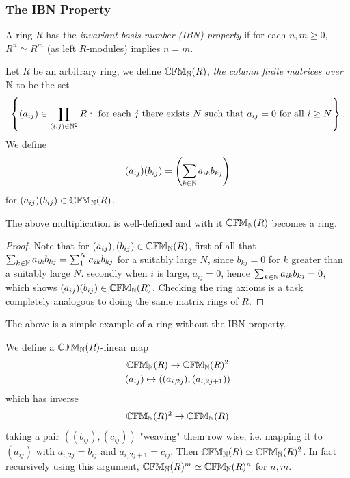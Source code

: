 \subsubsection{The IBN Property}
\begin{definition}
    A ring $R$ has the \emph{invariant basis number (IBN) property} if for each $n,m\geq 0$, $R^n\simeq R^m$ (as left $R$-modules) implies $n=m$.
\end{definition}
\begin{definition}
    Let $R$ be an arbitrary ring, we define $\mathbb{CFM}_{\mathbb{N}}(R)$, \emph{the column finite matrices over $\mathbb{N}$} to be the set 
    $$
        \left\{(a_{ij})\in \prod_{(i,j)\in \mathbb{N}^2} R : \text{ for each } j \text{ there exists } N \text{ such that } a_{ij}=0 \text{ for all } i\geq N\right\}.
    $$
    We define 
    $$
        (a_{ij})(b_{ij})= \left(\sum_{k\in \mathbb{N}}a_{ik}b_{kj}\right)
    $$
    for $(a_{ij})(b_{ij})\in \mathbb{CFM}_{\mathbb{N}}(R)$.
\end{definition}
\begin{proposition}
    The above multiplication is well-defined and with it $\mathbb{CFM}_{\mathbb{N}}(R)$ becomes a ring.
\end{proposition}
\begin{proof}
    Note that for $(a_{ij}),(b_{ij})\in \mathbb{CFM}_{\mathbb{N}}(R)$, first of all that $\sum_{k\in \mathbb{N}}a_{ik}b_{kj} = \sum_{1}^N a_{ik}b_{kj}$ for a suitably large $N$, since $b_{kj}=0$ for $k$ greater than a suitably large $N$. secondly when $i$ is large, $a_{ij} = 0$, hence $\sum_{k\in \mathbb{N}} a_{ik}b_{kj}=0$, which shows $(a_{ij})(b_{ij})\in \mathbb{CFM}_{\mathbb{N}}(R)$. Checking the ring axioms is a task completely analogous to doing the same matrix rings of $R$. 
\end{proof}
The above is a simple example of a ring without the IBN property. 
\begin{example}
    We define a $\mathbb{CFM}_{\mathbb{N}}(R)$-linear map 
    \begin{gather*}
        \mathbb{CFM}_{\mathbb{N}}(R) \rightarrow \mathbb{CFM}_{\mathbb{N}}(R)^2\\
        (a_{ij})\mapsto ((a_{i,2j}),(a_{i,2j+1}))
    \end{gather*}
    which has inverse 
    \begin{gather*}
        \mathbb{CFM}_{\mathbb{N}}(R)^2 \rightarrow \mathbb{CFM}_{\mathbb{N}}(R)
    \end{gather*}
    taking a pair $((b_{ij}),(c_{ij}))$ "weaving" them row wise, i.e. mapping it to $(a_{ij})$ with $a_{i,2j}=b_{ij}$ and $a_{i,2j+1}=c_{ij}$. Then $\mathbb{CFM}_{\mathbb{N}}(R)\simeq \mathbb{CFM}_{\mathbb{N}}(R)^2$. In fact recursively using this argument, $\mathbb{CFM}_{\mathbb{N}}(R)^m\simeq \mathbb{CFM}_{\mathbb{N}}(R)^n$ for $n,m$. 
\end{example}
